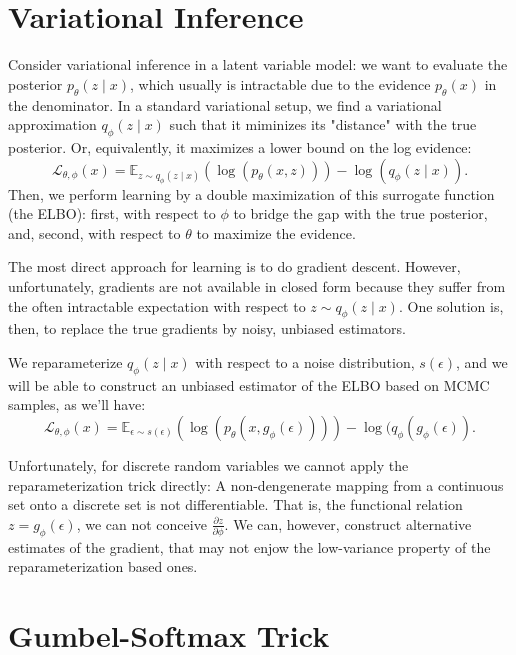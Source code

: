 \documentclass[11pt]{article}
\def\L{\mathcal{L}}
\def\E{\mathbb{E}}
\def\eps{\epsilon}
\begin{document}
\section{Variational Inference}

Consider variational inference in a latent variable model: we want to evaluate the posterior $p_\theta(z \mid x)$, which usually is intractable due to the evidence $p_\theta(x)$ in the denominator. In a standard variational setup, we find a variational approximation $q_\phi(z \mid x)$ such that it miminizes its "distance" with the true posterior. Or, equivalently, it maximizes a lower bound on the log evidence:
\begin{equation}
\L_{\theta,\phi}(x) = \E_{z\sim q_\phi(z\mid x)}(\log(p_\theta(x,z)))-\log(q_\phi(z\mid x)).
\end{equation}
Then, we perform learning by a double maximization of this surrogate function (the ELBO): first, with respect to $\phi$ to bridge the gap with the true posterior, and, second, with respect to $\theta$ to maximize the evidence.

The most direct approach for learning is to do gradient descent. However, unfortunately, gradients are not available in closed form because they suffer from the often intractable expectation with respect to $z\sim q_\phi(z\mid x)$. One solution is, then, to replace the true gradients by noisy, unbiased estimators.

We reparameterize $q_\phi(z\mid x)$ with respect to a noise distribution, $s(\eps)$, and we will be able to construct an unbiased estimator of the ELBO based on MCMC samples, as we'll have:
\begin{equation}
\L_{\theta,\phi}(x) = \E_{\eps\sim s(\eps)}(\log(p_\theta(x,g_\phi(\eps))))-\log(q_\phi(g_\phi(\eps)).
\end{equation}

Unfortunately, for discrete random variables we cannot apply the reparameterization trick directly: A non-dengenerate mapping from a continuous set onto a discrete set is not differentiable. That is, the functional relation $z = g_\phi(\eps)$, we can not conceive $\frac{\partial z}{\partial \phi}$. We can, however, construct alternative estimates of the gradient, that may not enjow the low-variance property of the reparameterization based ones.

\section{Gumbel-Softmax Trick}
\end{document}
